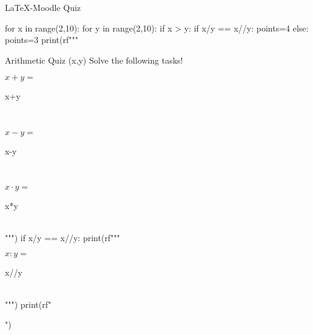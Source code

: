 \documentclass{article}
\begin{document}
\begin{quiz}{LaTeX-Moodle Quiz}
    \begin{python}
        for x in range(2,10):
          for y in range(2,10):
            if x > y:
              if x/y == x//y:
                points=4
              else:
                points=3  
              print(rf"""\begin{{cloze}}[points={points}]{{Arithmetic Quiz {(x,y)}}}
              Solve the following tasks!\\
              \begin{{numerical}}
              ${x} + {y} =$
              \item {x+y} 
              \end{{numerical}}\\
              \begin{{numerical}}
              ${x} - {y} =$
              \item {x-y} 
              \end{{numerical}}\\
              \begin{{numerical}}
              ${x} \cdot {y} =$
              \item {x*y} 
              \end{{numerical}}\\""")
              if x/y == x//y:
                print(rf"""\begin{{numerical}}
                ${x} : {y} =$
                \item {x//y} 
                \end{{numerical}}\\""")
              print(rf"\end{{cloze}}")
    \end{python}

\end{quiz}

\end{document}
